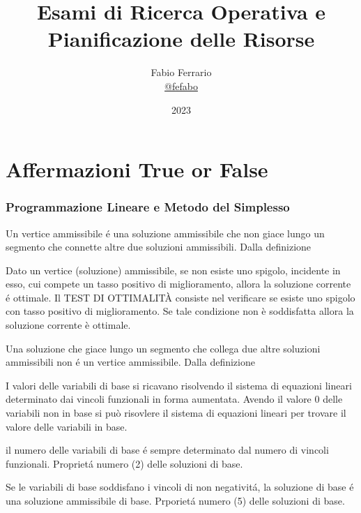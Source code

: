 \documentclass[12pt, a4paper, openany]{book}
\begin{document}
\title{Esami di Ricerca Operativa e Pianificazione delle Risorse}
\author{
	Fabio Ferrario\\
	\small{\href{https://t.me/fefabo}{@fefabo}}
}

\date{2023}
\maketitle


\tableofcontents

\chapter{Affermazioni True or False}

\subsection{Programmazione Lineare e Metodo del Simplesso}

\affermazionetrue
{Un vertice ammissibile é una soluzione ammissibile che non giace lungo un segmento che connette altre due soluzioni ammissibili.}
{Dalla definizione}

\affermazionetrue
{Dato un vertice (soluzione) ammissibile, se non esiste uno spigolo, incidente in esso, cui compete un tasso positivo di miglioramento, allora la soluzione corrente é ottimale.}
{Il TEST DI OTTIMALITÀ consiste nel verificare se
esiste uno spigolo con tasso positivo di
miglioramento. Se tale condizione non è
soddisfatta allora la soluzione corrente è
ottimale.}

\affermazionetrue
{Una soluzione che giace lungo un segmento che collega due altre soluzioni ammissibili non é un vertice ammissibile.}
{Dalla definizione}

\affermazionetrue
{I valori delle variabili di base si ricavano risolvendo il sistema di equazioni lineari determinato dai vincoli funzionali in forma aumentata.}
{Avendo il valore 0 delle variabili non in base si può risovlere il sistema di equazioni lineari per trovare il valore delle variabili in base.}


\affermazionetrue
{il numero delle variabili di base é sempre determinato dal numero di vincoli funzionali.}
{Proprietá numero (2) delle soluzioni di base.}

\affermazionetrue
{Se le variabili di base soddisfano i vincoli di non negativitá, la soluzione di base é una soluzione ammissibile di base.}
{Prporietá numero (5) delle soluzioni di base.}
\end{document}
